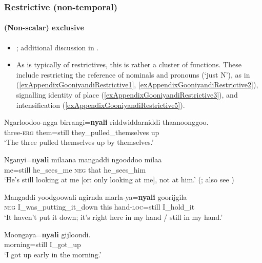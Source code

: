 \subsubsection{Restrictive (non-temporal)}
\paragraph{(Non-scalar) exclusive}
\label{appendixGooniyandiRestrictive}
\begin{itemize}
	\item \textcite[462–467]{McGregor1990}; additional discussion in \textcite{SchultzeBerndt2002}.
	\item As is typically of restrictives, this is rather a cluster of functions. These include restricting the reference of nominals and pronouns (\lq just N'), as in  (\ref{exAppendixGooniyandiRestrictive1}, \ref{exAppendixGooniyandiRestrictive2}), signalling identity of place (\ref{exAppendixGooniyandiRestrictive3}), and intensification (\ref{exAppendixGooniyandiRestrictive5}).
\end{itemize}

\begin{exe}
	\ex\label{exAppendixGooniyandiRestrictive1}
	\gll Ngarloodoo-ngga birrangi=\textbf{nyali} riddwiddarniddi thaanoonggoo.\\
	three-\textsc{erg} them=still they\_pulled\_themselves up\\
	\glt \lq The three pulled themselves up by themselves.\rq{ }\parencite[172–173]{McGregor1990}
	
	\ex\label{exAppendixGooniyandiRestrictive2}
	\gll Nganyi=\textbf{nyali} milaana mangaddi ngooddoo milaa\\
	me=still he\_sees\_me \textsc{neg} that he\_sees\_him\\
	\glt \lq He’s still looking at me [or: only looking at me], not at him.' (\cite[464]{McGregor1990}; also see \cite[254]{SchultzeBerndt2002})
	
	\ex\label{exAppendixGooniyandiRestrictive3}
	\gll Mangaddi yoodgoowali ngirnda marla-ya=\textbf{nyali} goorijgila\\
	\textsc{neg} I\_was\_putting\_it\_down this hand-\textsc{loc}=still I\_hold\_it\\
	\glt \lq It haven’t put it down; it’s right here in my hand / still in my hand.' \parencite[465]{McGregor1990}

	\ex\label{exAppendixGooniyandiRestrictive5}
	\gll Moongaya=\textbf{nyali} gijloondi.\\
	morning=still I\_got\_up\\
	\glt \lq I got up early in the morning.' \parencite[466]{McGregor1990}
\end{exe}

